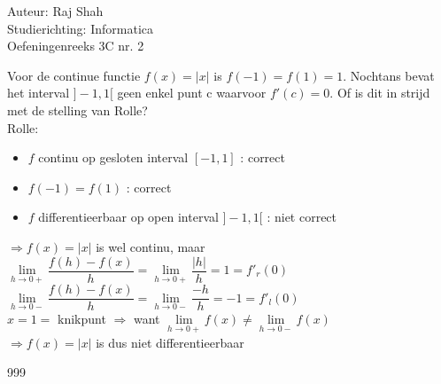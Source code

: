 \documentclass[a4paper]{article}
\begin{document}
  
\noindent \large Auteur: Raj Shah \\
\noindent \large Studierichting: Informatica\\
\noindent \large Oefeningenreeks 3C nr. 2\\

\medskip

\normalsize

Voor de continue functie $f(x) = | x |$ is $f(-1) = f(1) = 1$. Nochtans bevat het interval $]-1, 1[$ geen enkel punt c waarvoor $f'(c) = 0$. Of is dit in strijd met de stelling van Rolle?\\

Rolle: 
\begin{itemize}
	\item $f$ continu op gesloten interval $[-1, 1]$ : correct
	\item $f(-1) = f(1)$ : correct
	\item $f$ differentieerbaar op open interval $]-1, 1[$ : niet correct\\
 \end{itemize}

$\Rightarrow f(x) = | x |$ is wel continu, maar\\

$\lim\limits_{h\rightarrow 0+} \dfrac{f(h) - f(x)}{h} = \lim\limits_{h\rightarrow 0+} \dfrac{| h |}{h} = 1 = f'_{r}(0)$\\

$\lim\limits_{h\rightarrow 0-} \dfrac{f(h) - f(x)}{h} = \lim\limits_{h\rightarrow 0-} \dfrac{-h}{h} = -1 = f'_{l}(0)$\\

$x = 1 = $ knikpunt $\Rightarrow$ want $\lim\limits_{h\rightarrow 0+} f(x) \neq \lim\limits_{h\rightarrow 0-} f(x)$\\

$\Rightarrow f(x) = | x | $ is dus niet differentieerbaar 
 


\begin{thebibliography}{999}
\end{thebibliography}
\end{document}
